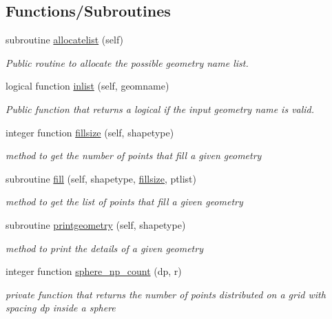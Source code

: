 \subsection*{Functions/\+Subroutines}
\begin{DoxyCompactItemize}
\item 
subroutine \hyperlink{namespacegeometry__mod_a1b6f259b0b6be71e02ffae7670f7d8ba}{allocatelist} (self)
\begin{DoxyCompactList}\small\item\em Public routine to allocate the possible geometry name list. \end{DoxyCompactList}\item 
logical function \hyperlink{namespacegeometry__mod_a22dd77024fce56da299445a697256155}{inlist} (self, geomname)
\begin{DoxyCompactList}\small\item\em Public function that returns a logical if the input geometry name is valid. \end{DoxyCompactList}\item 
integer function \hyperlink{namespacegeometry__mod_a92602e1198d3607613ea2722fb002685}{fillsize} (self, shapetype)
\begin{DoxyCompactList}\small\item\em method to get the number of points that fill a given geometry \end{DoxyCompactList}\item 
subroutine \hyperlink{namespacegeometry__mod_a095a8b47b3c23e154dcd31ab1441a065}{fill} (self, shapetype, \hyperlink{namespacegeometry__mod_a92602e1198d3607613ea2722fb002685}{fillsize}, ptlist)
\begin{DoxyCompactList}\small\item\em method to get the list of points that fill a given geometry \end{DoxyCompactList}\item 
subroutine \hyperlink{namespacegeometry__mod_aed4426181ca851b41717edd50268e5f3}{printgeometry} (self, shapetype)
\begin{DoxyCompactList}\small\item\em method to print the details of a given geometry \end{DoxyCompactList}\item 
integer function \hyperlink{namespacegeometry__mod_a05de7940b4e7df5a2b31f3d0414e3743}{sphere\+\_\+np\+\_\+count} (dp, r)
\begin{DoxyCompactList}\small\item\em private function that returns the number of points distributed on a grid with spacing dp inside a sphere \end{DoxyCompactList}\item 

\end{DoxyCompactItemize}
